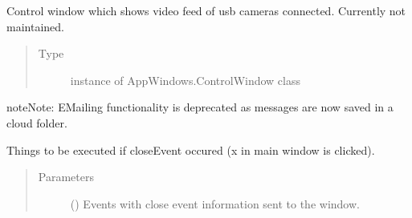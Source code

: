 \documentclass[letterpaper,10pt,english]{sphinxmanual}
\begin{document}
\begin{fulllineitems}
\begin{fulllineitems}
\begin{quote}
\begin{description}
\end{description}\end{quote}

\end{fulllineitems}


\begin{fulllineitems}
\label{\detokenize{NoSeMazeController/main:main.MainApp.control_window}}
\pysigstartsignatures
{}
\pysigstopsignatures
\sphinxAtStartPar
Control window which shows video feed of usb cameras connected. Currently not maintained.
\begin{quote}\begin{description}
\item[{Type}] \leavevmode
\sphinxAtStartPar
instance of AppWindows.ControlWindow class

\end{description}\end{quote}

\end{fulllineitems}


\begin{sphinxadmonition}{note}{Note:}
\sphinxAtStartPar
E\sphinxhyphen{}Mailing functionality is deprecated as messages are now saved in a cloud folder.
\end{sphinxadmonition}

\begin{fulllineitems}
\label{\detokenize{NoSeMazeController/main:main.MainApp.closeEvent}}
\pysigstartsignatures
{}
\pysigstopsignatures
\sphinxAtStartPar
Things to be executed if closeEvent occured (x in main window is clicked).
\begin{quote}\begin{description}
\item[{Parameters}] \leavevmode
\sphinxAtStartPar
{} () \textendash{} Events with close event information sent to the window.

\end{description}\end{quote}


\end{fulllineitems}
\end{fulllineitems}
\end{document}
